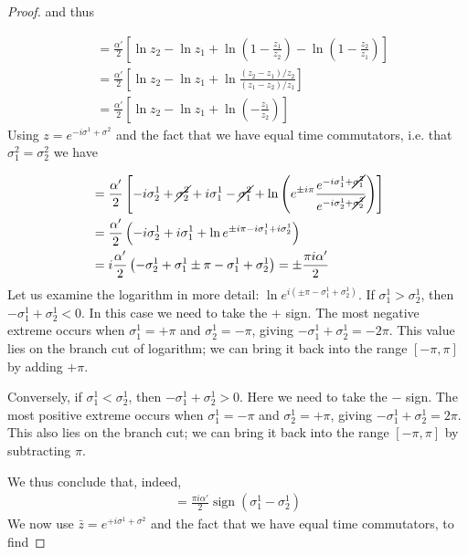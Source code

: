 \begin{tcolorbox}[breakable]
\begin{proof}
		and thus
		
		\begin{align*}
			[X_L(z_1), X_L(z_2)] &= \frac{\alpha'}{2} \left[ \ln z_2 - \ln z_1 + \ln \left( 1 - \frac{z_1}{z_2} \right) - \ln \left( 1 - \frac{z_2}{z_1} \right) \right] \\
			&= \frac{\alpha'}{2} \left[ \ln z_2 - \ln z_1 + \ln \frac{(z_2 - z_1)/z_2}{(z_1 - z_2)/z_1} \right] \\
			&= \frac{\alpha'}{2} \left[ \ln z_2 - \ln z_1 + \ln \left( -\frac{z_1}{z_2} \right) \right]
		\end{align*}
		Using \( z = e^{-i\sigma^1 + \sigma^2} \) and the fact that we have equal time commutators, i.e. that \( \sigma_1^2 = \sigma_2^2 \) we have
		
		\begin{align*}
			[X_L(z_1), X_L(z_2)] &= \frac{\alpha'}{2} \left[ -i\sigma_2^1 +\cancel{ \sigma_2^2} + i\sigma_1^1 -\cancel{ \sigma_1^2}+ \ln \left( e^{\pm i\pi} \frac{e^{-i\sigma_1^1 + \cancel{\sigma_1^2}}}{e^{-i\sigma_2^1 + \cancel{\sigma_2^2}}} \right) \right] \\
			&= \frac{\alpha'}{2} \left( -i\sigma_2^1 + i\sigma_1^1 + \ln e^{\pm i\pi - i\sigma_1^1 + i\sigma_2^1} \right) \\
			&= i\frac{\alpha'}{2} \left( -\sigma^1_2 + \sigma_1^1 \pm \pi - \sigma_1^1 + \sigma^1_2 \right) = \pm \frac{\pi i\alpha'}{2}
		\end{align*}
		Let us examine the logarithm in more detail: \(\ln e^{i(\pm\pi - \sigma_1^1 + \sigma_2^1)}\). If \(\sigma_1^1 > \sigma_2^1\), then \(-\sigma_1^1 + \sigma_2^1 < 0\). In this case we need to take the \(+\) sign. The most negative extreme occurs when \(\sigma_1^1 = +\pi\) and \(\sigma_2^1 = -\pi\), giving \(-\sigma_1^1 + \sigma_2^1 = -2\pi\). This value lies on the branch cut of logarithm; we can bring it back into the range \([-\pi, \pi]\) by adding \(+\pi\).
		
		Conversely, if \(\sigma_1^1 < \sigma_2^1\), then \(-\sigma_1^1 + \sigma_2^1 > 0\). Here we need to take the \(-\) sign. The most positive extreme occurs when \(\sigma_1^1 = -\pi\) and \(\sigma_2^1 = +\pi\), giving \(-\sigma_1^1 + \sigma_2^1 = 2\pi\). This also lies on the branch cut; we can bring it back into the range \([-\pi, \pi]\) by subtracting \(\pi\).
		
		We thus conclude that, indeed,
		\begin{align*}
			[X_L(z_1), X_L(z_2)] = \frac{\pi i\alpha'}{2} \operatorname{sign}(\sigma_1^1 - \sigma_2^1)
		\end{align*}
		We now use \(\bar{z} = e^{+i\sigma^1 + \sigma^2}\) and the fact that we have equal time commutators, to find
		

\end{proof}
\end{tcolorbox}
